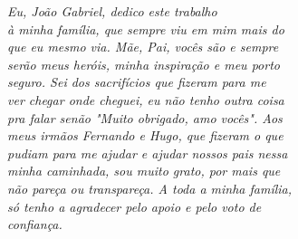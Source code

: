 \begin{dedicatoria}
   \vspace*{\fill}
   \centering
   \noindent
   \textit{Eu, João Gabriel, dedico este trabalho \\
   à minha família, que sempre viu em mim mais do \\ 
   que eu mesmo via. Mãe, Pai, vocês são e sempre \\
   serão meus heróis, minha inspiração e meu porto \\
   seguro. Sei dos sacrifícios que fizeram para me \\
   ver chegar onde cheguei, eu não tenho outra coisa \\
   pra falar senão "Muito obrigado, amo vocês". Aos \\
   meus irmãos Fernando e Hugo, que fizeram o que \\
   pudiam para me ajudar e ajudar nossos pais nessa \\
   minha caminhada, sou muito grato, por mais que \\
   não pareça ou transpareça. A toda a minha família, \\
   só tenho a agradecer pelo apoio e pelo voto de \\
   confiança.} \vspace*{\fill}
\end{dedicatoria}
